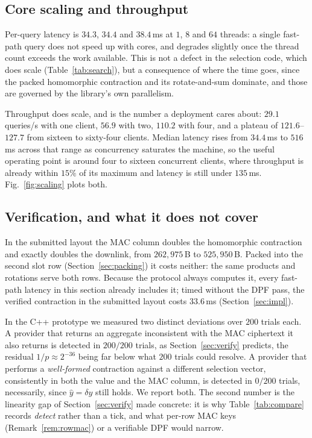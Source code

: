 \documentclass[a4paper,fleqn]{cas-dc}
\begin{document}
\subsection{Core scaling and throughput}
\label{sec:scaling}
Per-query latency is $34.3$, $34.4$ and $38.4$\,ms at $1$, $8$ and $64$
threads: a single fast-path query does not speed up with cores, and degrades
slightly once the thread count exceeds the work available. This is not a
defect in the selection code, which does scale (Table~\ref{tab:search}), but a
consequence of where the time goes, since the packed homomorphic contraction
and its rotate-and-sum dominate, and those are governed by the library's own
parallelism.

Throughput does scale, and is the number a deployment cares about: $29.1$
queries/s with one client, $56.9$ with two, $110.2$ with four, and a plateau
of $121.6$--$127.7$ from sixteen to sixty-four clients. Median latency rises
from $34.4$\,ms to $516$\,ms across that range as concurrency saturates the
machine, so the useful operating point is around four to sixteen concurrent
clients, where throughput is already within $15\%$ of its maximum and latency
is still under $135$\,ms. Fig.~\ref{fig:scaling} plots both.

\subsection{Verification, and what it does not cover}
\label{sec:verifyresult}
In the submitted layout the MAC column doubles the homomorphic contraction
and exactly doubles the downlink, from $262{,}975$\,B to $525{,}950$\,B.
Packed into the second slot row (Section~\ref{sec:packing}) it costs neither:
the same products and rotations serve both rows. Because the protocol always
computes it, every fast-path latency in this section already includes it;
timed without the DPF pass, the verified contraction in the submitted layout
costs $33.6$\,ms (Section~\ref{sec:impl}).

In the C++ prototype we measured two distinct deviations over $200$ trials
each. A provider that
returns an aggregate inconsistent with the MAC ciphertext it also returns is
detected in $200/200$ trials, as Section~\ref{sec:verify} predicts, the
residual $1/p\approx2^{-36}$ being far below what $200$ trials could resolve.
A provider that performs a \emph{well-formed} contraction against a different
selection vector, consistently in both the value and the MAC column, is
detected in $0/200$ trials, necessarily, since $\hat{y}=\delta y$ still holds.
We report both. The second number is the linearity gap of
Section~\ref{sec:verify} made concrete: it is why Table~\ref{tab:compare}
records \emph{detect} rather than a tick, and what per-row MAC keys
(Remark~\ref{rem:rowmac}) or a verifiable DPF would narrow.
\end{document}
